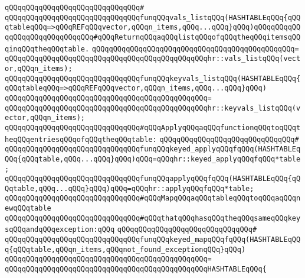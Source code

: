 \newline
\verb|qQQqqQQqqQQqqQQqqQQqqQQqqQQqqQQq#|\newline
\verb|qQQqqQQqqQQqqQQqqQQqqQQqqQQqqQQqfunqQQqvals_listqQQq(HASHTABLEqQQq{qQQqtableqQQq=>qQQqREFqQQqvector,qQQqn_items,qQQq...qQQq}qQQq)qQQqqQQqqQQqqQQqqQQqqQQqqQQqqQQq#qQQqReturnqQQqaqQQqlistqQQqofqQQqtheqQQqitemsqQQqinqQQqtheqQQqtable.|\newline
\verb|qQQqqQQqqQQqqQQqqQQqqQQqqQQqqQQqqQQqqQQqqQQqqQQq=|\newline
\verb|qQQqqQQqqQQqqQQqqQQqqQQqqQQqqQQqqQQqqQQqqQQqqQQqhr::vals_listqQQq(vector,qQQqn_items);|\newline
\newline
\verb|qQQqqQQqqQQqqQQqqQQqqQQqqQQqqQQqfunqQQqkeyvals_listqQQq(HASHTABLEqQQq{qQQqtableqQQq=>qQQqREFqQQqvector,qQQqn_items,qQQq...qQQq}qQQq)|\newline
\verb|qQQqqQQqqQQqqQQqqQQqqQQqqQQqqQQqqQQqqQQqqQQqqQQq=|\newline
\verb|qQQqqQQqqQQqqQQqqQQqqQQqqQQqqQQqqQQqqQQqqQQqqQQqhr::keyvals_listqQQq(vector,qQQqn_items);|\newline
\newline
\verb|qQQqqQQqqQQqqQQqqQQqqQQqqQQqqQQq#qQQqApplyqQQqaqQQqfunctionqQQqtoqQQqtheqQQqentriesqQQqofqQQqtheqQQqtable:|\newline
\verb|qQQqqQQqqQQqqQQqqQQqqQQqqQQqqQQq#|\newline
\verb|qQQqqQQqqQQqqQQqqQQqqQQqqQQqqQQqfunqQQqkeyed_applyqQQqfqQQq(HASHTABLEqQQq{qQQqtable,qQQq...qQQq}qQQq)qQQq=qQQqhr::keyed_applyqQQqfqQQq*table;|\newline
\verb|qQQqqQQqqQQqqQQqqQQqqQQqqQQqqQQqfunqQQqapplyqQQqfqQQq(HASHTABLEqQQq{qQQqtable,qQQq...qQQq}qQQq)qQQq=qQQqhr::applyqQQqfqQQq*table;|\newline
\newline
\verb|qQQqqQQqqQQqqQQqqQQqqQQqqQQqqQQq#qQQqMapqQQqaqQQqtableqQQqtoqQQqaqQQqnewqQQqtable|\newline
\verb|qQQqqQQqqQQqqQQqqQQqqQQqqQQqqQQq#qQQqthatqQQqhasqQQqtheqQQqsameqQQqkeysqQQqandqQQqexception:qQQq|\newline
\verb|qQQqqQQqqQQqqQQqqQQqqQQqqQQqqQQq#|\newline
\verb|qQQqqQQqqQQqqQQqqQQqqQQqqQQqqQQqfunqQQqkeyed_mapqQQqfqQQq(HASHTABLEqQQq{qQQqtable,qQQqn_items,qQQqnot_found_exceptionqQQq}qQQq)|\newline
\verb|qQQqqQQqqQQqqQQqqQQqqQQqqQQqqQQqqQQqqQQqqQQqqQQq=|\newline
\verb|qQQqqQQqqQQqqQQqqQQqqQQqqQQqqQQqqQQqqQQqqQQqqQQqHASHTABLEqQQq{|\newline

